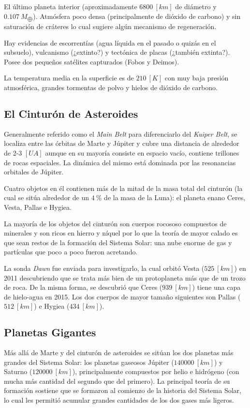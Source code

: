 \documentclass{tufte-handout}
\begin{document}
El último planeta interior (aproximadamente $6800~[km]$ de diámetro y $0.107~M_{\bigoplus}$). Atmósfera poco densa (principalmente de dióxido de carbono) y sin saturación de cráteres lo cual sugiere algún mecanismo de regeneración.

Hay evidencias de escorrentías (agua líquida en el pasado o quizás en el subsuelo), vulcanismo (¿extinto?) y tectónica de placas (¿también extinta?). Posee dos pequeños satélites capturados (Fobos y Deimos).

La temperatura media en la superficie es de $210~[K]$ con muy baja presión atmosférica, grandes tormentas de polvo y hielos de dióxido de carbono.

\subsection{El Cinturón de Asteroides}

Generalmente referido como el \emph{Main Belt} para diferenciarlo del \emph{Kuiper Belt}, se localiza entre las órbitas de Marte y Júpiter y cubre una distancia de alrededor de 2-3 $[UA]$ aunque en su mayoría consiste en espacio vacío, contiene trillones de rocas espaciales. La dinámica del mismo está dominada por las resonancias orbitales de Júpiter.

Cuatro objetos en él contienen más de la mitad de la masa total del cinturón (la cual se sitúa alrededor de un $4~\%$ de la masa de la Luna): el planeta enano Ceres, Vesta, Pallas e Hygiea.

La mayoría de los objetos del cinturón son cuerpos rocososo compuestos de minerales y son ricos en hierro y níquel por lo que la teoría de mayor calado es que sean restos de la formación del Sistema Solar: una nube enorme de gas y partículas que poco a poco fueron acretando.

La sonda \emph{Dawn} fue enviada para investigarlo, la cual orbitó Vesta ($525~[km]$) en 2011 descubriendo que se trata más bien de un protoplaneta más que de un trozo de roca. De la misma forma, se descubrió que Ceres ($939~[km]$) tiene una capa de hielo-agua en 2015. Los dos cuerpos de mayor tamaño siguientes son Pallas ($512~[km]$) e Hygiea ($434~[km]$).

\subsection{Planetas Gigantes}

Más allá de Marte y del cinturón de asteroides se sitúan los dos planetas más grandes del Sistema Solar: los planetas gaseosos Júpiter ($140000~[km]$) y Saturno ($120000~[km]$), principalmente compuestos por helio e hidrógeno (con mucha más cantidad del segundo que del primero). La principal teoría de su formación sostiene que se formaron al comienzo de la historia del Sistema Solar, lo cual les permitió acumular grandes cantidades de los dos gases más ligeros.
\end{document}
